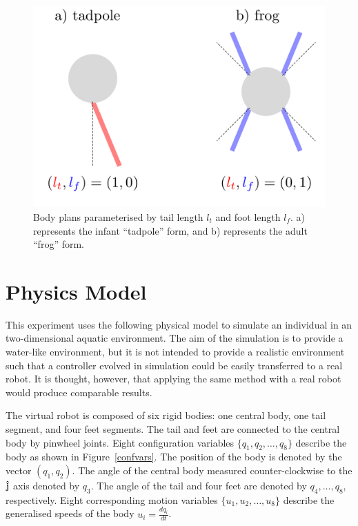\begin{figure}[h]
  \centering
  \includegraphics[scale=0.4]{fig/forms.pdf} 
  \vspace{-30pt}
  \caption[Body plans]{\label{morphology}Body plans parameterised by
    tail length $l_t$ and foot length $l_f$. a) represents the infant
    ``tadpole'' form, and b) represents the adult ``frog'' form. }
\end{figure}

\section{Physics Model}

This experiment uses the following physical model to simulate an
individual in an two-dimensional aquatic environment.  The aim of the
simulation is to provide a water-like environment, but it is not
intended to provide a realistic environment such that a controller
evolved in simulation could be easily transferred to a real robot.  It
is thought, however, that applying the same method with a real robot
would produce comparable results.

The virtual robot is composed of six rigid bodies: one central body,
one tail segment, and four feet segments.  The tail and feet are
connected to the central body by pinwheel joints.  Eight configuration
variables $\{q_1, q_2, \ldots, q_8\}$ describe the body as shown in
Figure~\ref{confvars}.  The position of the body is denoted by the
vector $(q_1, q_2)$.  The angle of the central body measured
counter-clockwise to the $\bf \hat j$ axis denoted by $q_3$.  The
angle of the tail and four feet are denoted by $q_4, \ldots, q_8$,
respectively.  Eight corresponding motion variables $\{u_1, u_2,
\ldots, u_8\}$ describe the generalised speeds of the body $u_i =
\frac{d q_i}{d t}$.

